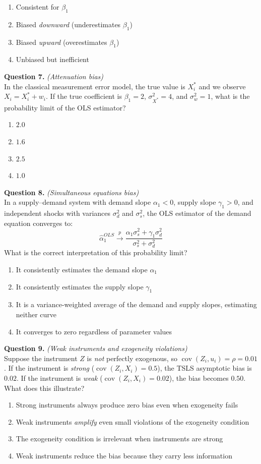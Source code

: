 \documentclass[11pt]{article}
\newcommand{\choices}[4]{%
  \begin{enumerate}[label=(\alph*), leftmargin=2em, itemsep=2pt]
    \item #1
    \item #2
    \item #3
    \item #4
  \end{enumerate}
}
\begin{document}
\choices
{Consistent for $\beta_1$}
{Biased \emph{downward} (underestimates $\beta_1$)}
{Biased \emph{upward} (overestimates $\beta_1$)}
{Unbiased but inefficient}

\bigskip


\noindent\textbf{Question 7.} \textit{(Attenuation bias)} \\[0.3em]
In the classical measurement error model, the true value is $X_i^* $ and we observe $X_i = X_i^* + w_i$. If the true coefficient is $\beta_1 = 2$, $\sigma_{X^*}^2 = 4$, and $\sigma_w^2 = 1$, what is the probability limit of the OLS estimator?

\choices
{$2.0$}
{$1.6$}
{$2.5$}
{$1.0$}

\bigskip


\noindent\textbf{Question 8.} \textit{(Simultaneous equations bias)} \\[0.3em]
In a supply--demand system with demand slope $\alpha_1 < 0$, supply slope $\gamma_1 > 0$, and independent shocks with variances $\sigma_d^2$ and $\sigma_s^2$, the OLS estimator of the demand equation converges to:
\[
\widehat{\alpha}_1^{OLS} \xrightarrow{p} \frac{\alpha_1 \sigma_s^2 + \gamma_1 \sigma_d^2}{\sigma_s^2 + \sigma_d^2}
\]
What is the correct interpretation of this probability limit?

\choices
{It consistently estimates the demand slope $\alpha_1$}
{It consistently estimates the supply slope $\gamma_1$}
{It is a variance-weighted average of the demand and supply slopes, estimating neither curve}
{It converges to zero regardless of parameter values}

\bigskip


\noindent\textbf{Question 9.} \textit{(Weak instruments and exogeneity violations)} \\[0.3em]
Suppose the instrument $Z$ is \emph{not} perfectly exogenous, so $\operatorname{cov}(Z_i, u_i) = \rho = 0.01$. If the instrument is \emph{strong} ($\operatorname{cov}(Z_i, X_i) = 0.5$), the TSLS asymptotic bias is $0.02$. If the instrument is \emph{weak} ($\operatorname{cov}(Z_i, X_i) = 0.02$), the bias becomes $0.50$. What does this illustrate?

\choices
{Strong instruments always produce zero bias even when exogeneity fails}
{Weak instruments \emph{amplify} even small violations of the exogeneity condition}
{The exogeneity condition is irrelevant when instruments are strong}
{Weak instruments reduce the bias because they carry less information}
\end{document}
